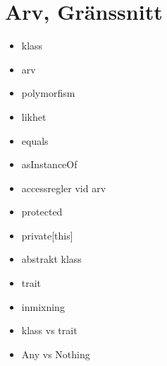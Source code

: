 \chapter{Arv, Gränssnitt}\label{chapter:W07}
\begin{multicols}{2}\begin{itemize}[nosep,label={$\square$}]
\item klass
\item arv
\item polymorfism
\item likhet
\item equals
\item asInstanceOf
\item accessregler vid arv
\item protected
\item private[this]
\item abstrakt klass
\item trait
\item inmixning
\item klass vs trait
\item Any vs Nothing\end{itemize}\end{multicols}

